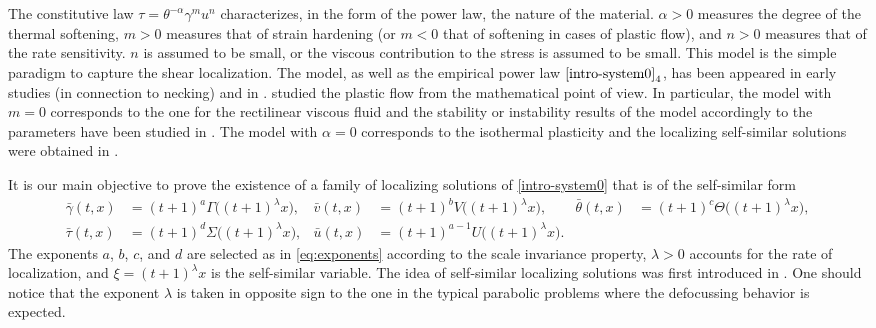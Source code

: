 \documentclass[a4paper,11pt]{article}
\def\bg{{\bar{\gamma}}}
\def\bv{{\bar{v}}}
\def\bth{{\bar{\theta}}}
\def\bu{{\bar{u}}}
\theoremstyle{remark}
\begin{document}
The constitutive law $\tau = \theta^{-\alpha}\gamma^m u^n$ characterizes, in the form of the power law, the nature of the material. $\alpha>0$ measures the degree of the thermal softening, $m>0$ measures that of strain hardening (or $m<0$ that of softening in cases of plastic flow), and $n>0$ measures that of the rate sensitivity. $n$ is assumed to be small, or the viscous contribution to the stress is assumed to be small. This model is the simple paradigm to capture the shear localization. The model, as well as the empirical power law $\eqref{intro-system0}_4$, has been appeared in early studies \cite{HN77} (in connection to necking) and in \cite{WF83,FM87}. \cite{tzavaras_plastic_1986,tzavaras_strain_1991,tzavaras_nonlinear_1992} studied the plastic flow from the mathematical point of view. In particular, the model with $m=0$ corresponds to the one for the rectilinear viscous fluid and the stability or instability results of the model accordingly to the parameters have been studied in \cite{bertsch_effect_1991, DH_1983, Tz_1986, Tz_1987, KOT14, KLT_HYP2016}. The model with $\alpha=0$ corresponds to the isothermal plasticity and the localizing self-similar solutions were obtained in \cite{LT16, KLT_2016}.

%
%
%
%

It is our main objective to prove the existence of a family of localizing solutions of \eqref{intro-system0} that is of the self-similar form
\begin{equation} \label{intro-sols}
\begin{aligned}
 \bg(t,x) &= (t+1)^a\Gamma\big((t+1)^\lambda x\big), & \bv(t,x) &= (t+1)^bV\big((t+1)^\lambda x\big), & \bth(t,x) &= (t+1)^c\Theta\big((t+1)^\lambda x\big),\\
 \bar{\tau}(t,x) &= (t+1)^d\Sigma\big((t+1)^\lambda x\big), & \bu(t,x) &= (t+1)^{a-1}U\big((t+1)^\lambda x\big).
\end{aligned}
\end{equation}
The exponents $a$, $b$, $c$, and $d$ are selected as in \eqref{eq:exponents} according to the scale invariance property, $\lambda>0$ accounts for the rate of localization, and $\xi=(t+1)^\lambda x$ is the self-similar variable. The idea of self-similar localizing solutions was first introduced in \cite{KOT14}.   One should notice that the exponent $\lambda$ is taken in opposite sign to the one in the typical parabolic problems where the defocussing behavior is expected.
\end{document}
